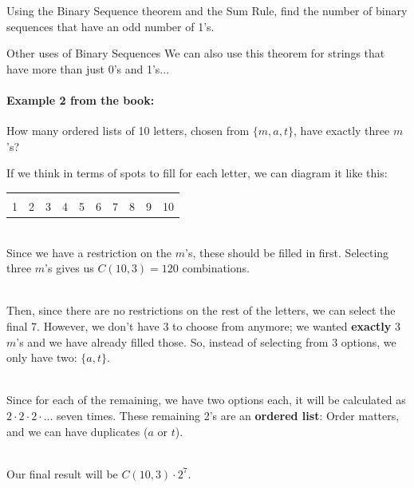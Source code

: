 {    \hrulefill
       
    \begin{questionNOGRADE}{\thequestion}
	    Using the Binary Sequence theorem and the Sum Rule, find the number
	    of binary sequences that have an odd number of 1's.
	\end{questionNOGRADE}
	
	\newpage
	
	\begin{intro}{Other uses of Binary Sequences}
		We can also use this theorem for strings that have more than just 0's and 1's...
		
		\paragraph{Example 2 from the book:} How many ordered lists of 10 letters, chosen from $\{m, a, t\}$, 
		have exactly three $m$'s?
		
		If we think in terms of spots to fill for each letter, we can diagram it like this:
		
		\begin{center}
			\begin{tabular}{c c c c c c c c c c}
				\fitb[0.5cm] & \fitb[0.5cm] & \fitb[0.5cm] & \fitb[0.5cm] & \fitb[0.5cm] & \fitb[0.5cm] & \fitb[0.5cm] & \fitb[0.5cm] & \fitb[0.5cm] & \fitb[0.5cm]
				\\
				1 & 2 & 3 & 4 & 5 & 6 & 7 & 8 & 9 & 10
			\end{tabular}
		\end{center}
		
		~\\ Since we have a restriction on the $m$'s, these should be filled in first. Selecting three $m$'s gives us
		$C(10,3) = 120$ combinations.
		
		~\\ Then, since there are no restrictions on the rest of the letters, we can select the final 7.
		However, we don't have 3 to choose from anymore; we wanted \textbf{exactly} 3 $m$'s and we have
		already filled those. So, instead of selecting from 3 options, we only have two: $\{a, t\}$.
		
		~\\ Since for each of the remaining, we have two options each, it will be calculated as $2 \cdot 2 \cdot 2 \cdot ...$
		seven times. These remaining 2's are an \textbf{ordered list}: Order matters, and we can have duplicates ($a$ or $t$).
		
		~\\ Our final result will be $C(10,3) \cdot 2^{7}$.
	\end{intro}
	
}
